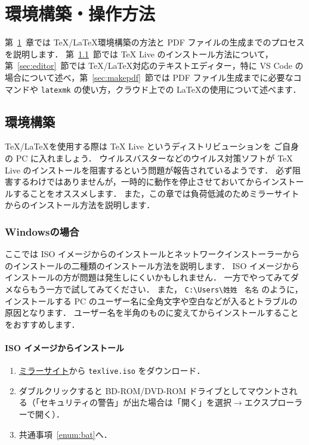 \chapter{環境構築・操作方法}
\label{ch:howtouse}

第~\ref{ch:howtouse}~章では \TeX/\LaTeX 環境構築の方法と PDF ファイルの生成までのプロセスを説明します．
第~\ref{sec:environment}~節では TeX Live のインストール方法について，第~\ref{sec:editor}~節では \TeX/\LaTeX 対応のテキストエディター，特に VS Code の場合について述べ，第~\ref{sec:makepdf}~節では PDF ファイル生成までに必要なコマンドや \verb|latexmk| の使い方，クラウド上での \LaTeX の使用について述べます．

\section{環境構築}
\label{sec:environment}

\TeX/\LaTeX を使用する際は TeX Live というディストリビューションを ご自身の PC に入れましょう．
ウイルスバスターなどのウイルス対策ソフトが TeX Live のインストールを阻害するという問題が報告されているようです．
必ず阻害するわけではありませんが，一時的に動作を停止させておいてからインストールすることをオススメします．
また，この章では負荷低減のためミラーサイトからのインストール方法を説明します．

\subsection{Windowsの場合}
\label{ssec:windows}

ここでは ISO イメージからのインストールとネットワークインストーラーからのインストールの二種類のインストール方法を説明します．
ISO イメージからインストールの方が問題は発生しにくいかもしれません．
一方でやってみてダメならもう一方で試してみてください．
また， \verb|C:\Users\姓姓　名名| のように，インストールする PC のユーザー名に全角文字や空白などが入るとトラブルの原因となります．
ユーザー名を半角のものに変えてからインストールすることをおすすめします．

\subsubsection*{ISO イメージからインストール}

\begin{enumerate}
    \item \href{http://mirror.ctan.org/systems/texlive/Images/}{ミラーサイト}から \verb|texlive.iso| をダウンロード．
    \item ダブルクリックすると BD-ROM/DVD-ROM ドライブとしてマウントされる（「セキュリティの警告」が出た場合は「開く」を選択$\to$エクスプローラーで開く）．
    \item 共通事項~\ref{enum:bat}へ．
\end{enumerate}


